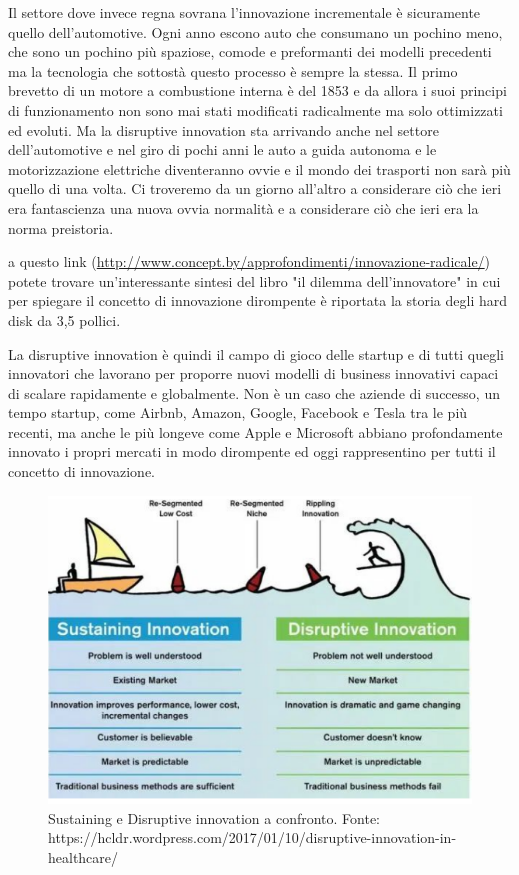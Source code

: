 Il settore dove invece regna sovrana l'innovazione incrementale è sicuramente quello dell'automotive. Ogni anno escono auto che consumano un pochino meno, che sono un pochino più spaziose, comode e preformanti dei modelli precedenti ma la tecnologia che sottostà questo processo è sempre la stessa. Il primo brevetto di un motore a combustione interna è del 1853 e da allora i suoi principi di funzionamento non sono mai stati modificati radicalmente ma solo ottimizzati ed evoluti.
Ma la disruptive innovation sta arrivando anche nel settore dell'automotive e nel giro di pochi anni le auto a guida autonoma e le motorizzazione elettriche diventeranno ovvie e il mondo dei trasporti non sarà più quello di una volta. Ci troveremo da un giorno all'altro a considerare ciò che ieri era fantascienza una nuova ovvia normalità e a considerare ciò che ieri era la norma preistoria.

a questo link (\url{http://www.concept.by/approfondimenti/innovazione-radicale/}) potete trovare un'interessante sintesi del libro "il dilemma dell'innovatore" in cui per spiegare il concetto di innovazione dirompente è  riportata la storia degli hard disk da 3,5 pollici.

La disruptive innovation è quindi il campo di gioco delle startup e di tutti quegli innovatori che lavorano per proporre nuovi modelli di business innovativi capaci di scalare rapidamente e globalmente. Non è un caso che aziende di successo, un tempo startup, come Airbnb, Amazon, Google, Facebook e Tesla tra le più recenti, ma anche le più longeve come Apple e Microsoft abbiano profondamente innovato i propri mercati in modo dirompente ed oggi rappresentino per tutti il concetto di innovazione. 

\begin{figure}[!h]
	\centering
	\includegraphics[width=\textwidth]{"immagini/Disruptive Innovation"}
		\caption{Sustaining e Disruptive innovation a confronto. Fonte: https://hcldr.wordpress.com/2017/01/10/disruptive-innovation-in-healthcare/}
\end{figure}


